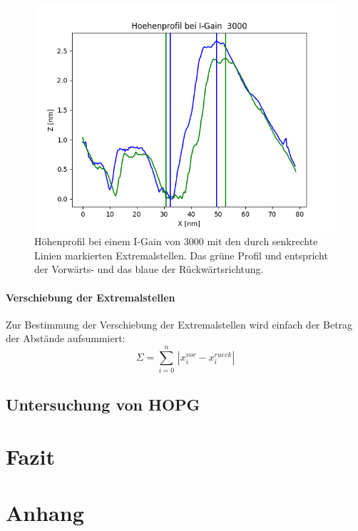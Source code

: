 \documentclass[12pt,a4paper]{article}
\begin{document}
\begin{figure}
\centering
\includegraphics[scale=0.8]{Bilder/Profil_IGain_3000_Peakbestimmung.png}
\caption{Höhenprofil bei einem I-Gain von 3000 mit den durch senkrechte Linien markierten Extremalstellen. Das grüne Profil und entspricht der Vorwärts- und das blaue der Rückwärtsrichtung.}
\label{fig:Gold_IGain_Extremalstellen}
\end{figure}

\paragraph{Verschiebung der Extremalstellen}
Zur Bestimmung der Verschiebung der Extremalstellen wird einfach der Betrag der Abstände aufsummiert:
\begin{equation*}
\Sigma = \sum _{i = 0} ^n \, |x_i^{vor} - x_i^{rueck}|
\end{equation*}


\subsection{Untersuchung von HOPG}

\section{Fazit}

\section{Anhang}
\end{document}
